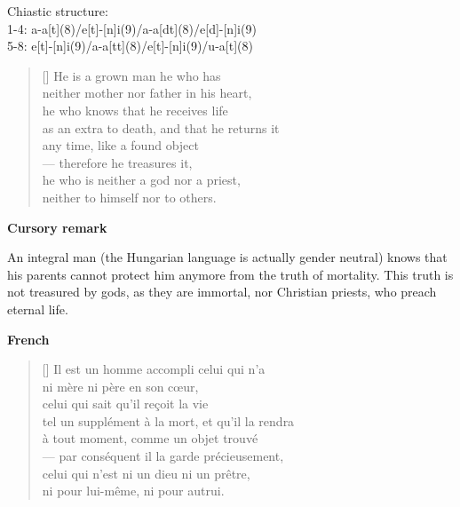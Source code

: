 \documentclass[a4paper,12pt,twoside,final]{book}
\begin{document}

\noindent Chiastic structure: \\
1-4: a-a[t](8)/e[t]-[n]i(9)/a-a[dt](8)/e[d]-[n]i(9) \\
5-8: e[t]-[n]i(9)/a-a[tt](8)/e[t]-[n]i(9)/u-a[t](8)

\newpage



\settowidth{\versewidth}{he who knows that he receives so much life}

\begin{verse}[\versewidth]
  He is a grown man he who has \\
  neither mother nor father in his heart, \\
  he who knows that he receives life \\
  as an extra to death, and that he returns it \\
  any time, like a found object \\
  --- therefore he treasures it, \\
  he who is neither a god nor a priest, \\
  neither to himself nor to others. \\
\end{verse}

\bigskip

\noindent \textbf{Cursory remark}

\medskip

An integral man (the Hungarian language is actually gender neutral)
knows that his parents cannot protect him anymore from the truth of
mortality. This truth is not treasured by gods, as they are immortal,
nor Christian priests, who preach eternal life.

\bigskip

\noindent \textbf{French}


\settowidth{\versewidth}{tel un supplément à la mort, et qu'il la rendra}

\begin{verse}[\versewidth]
  Il est un homme accompli celui qui n'a \\
  ni mère ni père en son cœur, \\
  celui qui sait qu'il reçoit la vie \\
  tel un supplément à la mort, et qu'il la rendra \\
  à tout moment, comme un objet trouvé \\
  --- par conséquent il la garde précieusement, \\
  celui qui n'est ni un dieu ni un prêtre, \\
  ni pour lui-même, ni pour autrui. \\
\end{verse}
\end{document}
